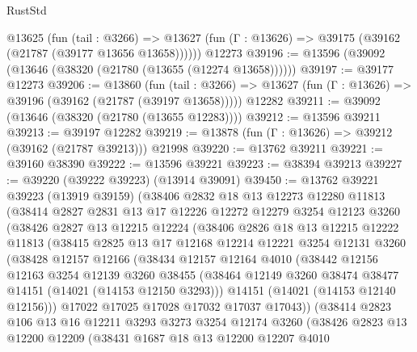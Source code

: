 \begin{lexlean}{RustStd}
\begin{coremodule}
    @13625
      (fun (tail : @3266) =>
      @13627 (fun (Γ : @13626) => @39175 (@39162 (@21787 (@39177 @13656 @13658))))))
    @12273
@39196 := @13596 (@39092 (@13646 (@38320 (@21780 (@13655 (@12274 @13658))))))
@39197 := @39177 @12273
@39206 := @13860
    (fun (tail : @3266) => @13627 (fun (Γ : @13626) => @39196 (@39162 (@21787 (@39197 @13658)))))
    @12282
@39211 := @39092 (@13646 (@38320 (@21780 (@13655 @12283))))
@39212 := @13596 @39211
@39213 := @39197 @12282
@39219 := @13878 (fun (Γ : @13626) => @39212 (@39162 (@21787 @39213))) @21998
@39220 := @13762 @39211
@39221 := @39160 @38390
@39222 := @13596 @39221
@39223 := @38394 @39213
@39227 := @39220 (@39222 @39223) (@13914 @39091)
@39450 := @13762
    @39221
    @39223
    (@13919 @39159)
    (@38406
      @2832
      @18
      @13
      @12273
      @12280
      @11813
      (@38414
        @2827
        @2831
        @13
        @17
        @12226
        @12272
        @12279
        @3254
        @12123
        @3260
        (@38426
          @2827
          @13
          @12215
          @12224
          (@38406
            @2826
            @18
            @13
            @12215
            @12222
            @11813
            (@38415
              @2825
              @13
              @17
              @12168
              @12214
              @12221
              @3254
              @12131
              @3260
              (@38428
                @12157
                @12166
                (@38434
                  @12157
                  @12164
                  @4010
                  (@38442
                    @12156
                    @12163
                    @3254
                    @12139
                    @3260
                    @38455
                    (@38464 @12149 @3260 @38474 @38477 @14151 (@14021 (@14153 @12150 @3293)))
                    @14151
                    (@14021 (@14153 @12140 @12156)))
                  @17022
                  @17025
                  @17028
                  @17032
                  @17037
                  @17043))
              (@38414
                @2823
                @106
                @13
                @16
                @12211
                @3293
                @3273
                @3254
                @12174
                @3260
                (@38426
                  @2823
                  @13
                  @12200
                  @12209
                  (@38431
                    @1687
                    @18
                    @13
                    @12200
                    @12207
                    @4010

\end{coremodule}
\end{lexlean}
